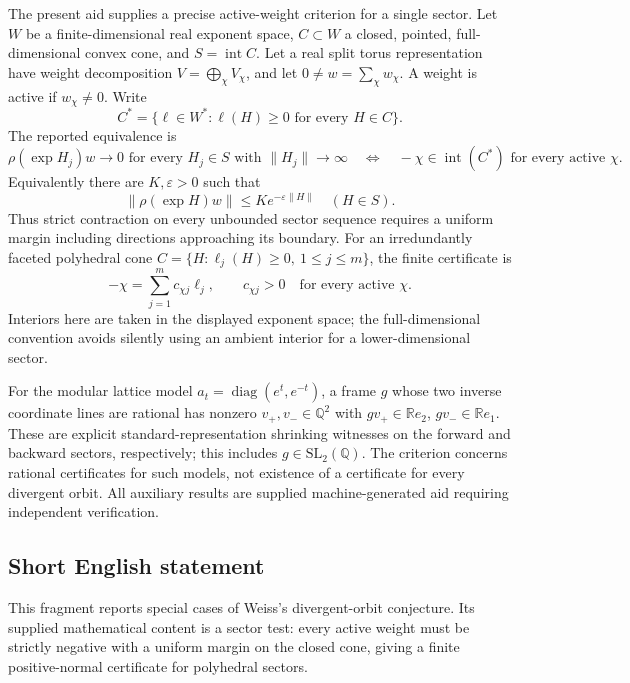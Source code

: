 \documentclass[11pt]{article}
\newcommand{\Q}{\mathbb{Q}}
\newcommand{\R}{\mathbb{R}}
\begin{document}
The present aid supplies a precise active-weight criterion for a single sector. Let $W$ be a finite-dimensional real exponent space, $C\subset W$ a closed, pointed, full-dimensional convex cone, and $S=\operatorname{int}C$. Let a real split torus representation have weight decomposition $V=\bigoplus_\chi V_\chi$, and let $0\ne w=\sum_\chi w_\chi$. A weight is active if $w_\chi\ne0$. Write
\[
 C^*=\{\ell\in W^*: \ell(H)\ge0\text{ for every }H\in C\}.
\]
The reported equivalence is
\[
 \rho(\exp H_j)w\longrightarrow0
 \text{ for every }H_j\in S\text{ with }\|H_j\|\to\infty
 \quad\Longleftrightarrow\quad
 -\chi\in\operatorname{int}(C^*)\text{ for every active }\chi.
\]
Equivalently there are $K,\varepsilon>0$ such that
\[
 \|\rho(\exp H)w\|\le Ke^{-\varepsilon\|H\|}\quad(H\in S).
\]
Thus strict contraction on every unbounded sector sequence requires a uniform margin including directions approaching its boundary. For an irredundantly faceted polyhedral cone $C=\{H:\ell_j(H)\ge0,\ 1\le j\le m\}$, the finite certificate is
\[
 -\chi=\sum_{j=1}^m c_{\chi j}\ell_j,\qquad c_{\chi j}>0
 \quad\text{for every active }\chi.
\]
Interiors here are taken in the displayed exponent space; the full-dimensional convention avoids silently using an ambient interior for a lower-dimensional sector.

For the modular lattice model $a_t=\operatorname{diag}(e^t,e^{-t})$, a frame $g$ whose two inverse coordinate lines are rational has nonzero $v_+,v_-\in\Q^2$ with $gv_+\in\R e_2$, $gv_-\in\R e_1$. These are explicit standard-representation shrinking witnesses on the forward and backward sectors, respectively; this includes $g\in\mathrm{SL}_2(\Q)$. The criterion concerns rational certificates for such models, not existence of a certificate for every divergent orbit. All auxiliary results are supplied machine-generated aid requiring independent verification.
\subsection{Short English statement}
This fragment reports special cases of Weiss's divergent-orbit conjecture. Its supplied mathematical content is a sector test: every active weight must be strictly negative with a uniform margin on the closed cone, giving a finite positive-normal certificate for polyhedral sectors.
\end{document}
